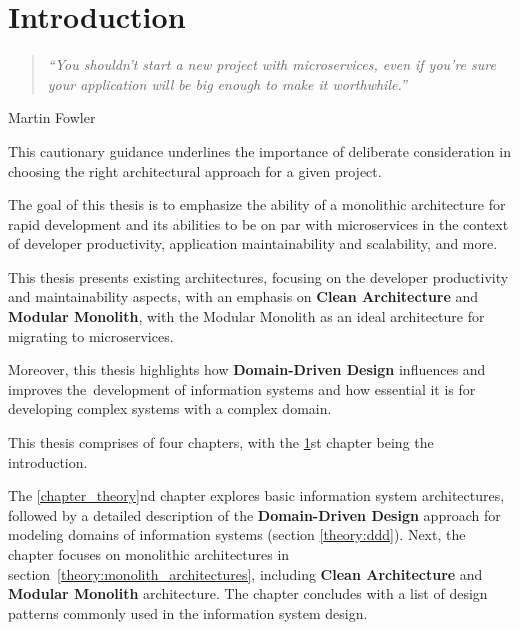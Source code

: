 % 

\chapter{Introduction}
\label{chapter_intro}

\vspace{-4pt}
\begin{quote}
    \textit{``You shouldn't start a new project with microservices, even if you're sure your application will be big enough to make it worthwhile.''}
\end{quote}
\vspace{-28pt}
\begin{flushright}
    {Martin Fowler \cite{martin_fowler:monlith_first}}
\end{flushright}
\vspace{-7pt}

This cautionary guidance underlines the importance of deliberate consideration in choosing the right architectural approach for a given project.

The goal of this thesis is to emphasize the ability of a monolithic architecture for rapid development and its abilities to be on par with microservices in the context of developer productivity, application maintainability and scalability, and more.

This thesis presents existing architectures, focusing on the developer productivity and maintainability aspects, with an emphasis on \textbf{Clean Architecture} and \textbf{Modular Monolith}, with the Modular Monolith as an ideal architecture for migrating to microservices. 

Moreover, this thesis highlights how \textbf{Domain-Driven Design} influences and improves the~development of information systems and how essential it is for developing complex systems with a complex domain.

This thesis comprises of four chapters, with the \ref{chapter_intro}st chapter being the introduction. 

The \ref{chapter_theory}nd chapter explores basic information system architectures, followed by a detailed description of the \textbf{Domain-Driven Design} approach for modeling domains of information systems (section \ref{theory:ddd}). Next, the chapter focuses on monolithic architectures in section~\ref{theory:monolith_architectures}, including \textbf{Clean Architecture} and \textbf{Modular Monolith} architecture. The chapter concludes with a list of design patterns commonly used in the information system design.

